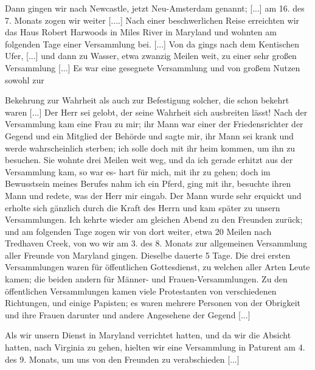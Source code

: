 Dann gingen wir nach Newcastle, jetzt Neu-Amsterdam
genannt; [...] am 16. des 7. Monats zogen wir weiter [....]
Nach einer beschwerlichen Reise erreichten wir das Haus Robert
Harwoods in Miles River 
in Maryland und wohnten am
folgenden Tage einer Versammlung bei. [...] Von da gings
nach dem Kentischen Ufer, [...] und dann zu Wasser, etwa zwanzig
Meilen weit, zu einer sehr großen Versammlung [...] Es war
eine gesegnete Versammlung und von großem Nutzen sowohl zur

Bekehrung zur Wahrheit als auch zur Befestigung solcher, die
schon bekehrt waren [...] Der Herr sei gelobt, der seine 
Wahrheit sich ausbreiten lässt! Nach der Versammlung kam eine Frau
zu mir; ihr Mann war einer der Friedensrichter der Gegend
und ein Mitglied der Behörde und sagte mir, ihr Mann
sei krank und werde wahrscheinlich sterben; ich solle doch mit ihr
heim kommen, um ihn zu besuchen. Sie wohnte drei Meilen weit
weg, und da ich gerade erhitzt aus der Versammlung kam, so war
es- hart für mich, mit ihr zu gehen; doch im Bewusstsein meines
Berufes nahm ich ein Pferd, ging mit ihr, besuchte ihren Mann
und redete, was der Herr mir eingab. Der Mann wurde sehr
erquickt und erholte sich gänzlich durch die Kraft des Herrn und
kam später zu unsern Versammlungen. Ich kehrte wieder am
gleichen Abend zu den Freunden zurück; und am folgenden Tage
zogen wir von dort weiter, etwa 20 Meilen nach Tredhaven
Creek, von wo wir am 3. des 8. Monats 
zur allgemeinen Versammlung aller Freunde von Maryland gingen. Dieselbe dauerte
5 Tage. Die drei ersten Versammlungen waren für öffentlichen
Gottesdienst, zu welchen 
aller Arten Leute kamen; die beiden
andern für Männer- und Frauen-Versammlungen. Zu den öffentlichen 
Versammlungen kamen viele Protestanten von verschiedenen
Richtungen, und einige Papisten; es waren mehrere Personen
von der Obrigkeit und ihre Frauen darunter und andere Angesehene 
der Gegend [...] 

Als wir unsern Dienst in Maryland verrichtet hatten, und
da wir die Absicht hatten, nach Virginia zu gehen, hielten wir
eine Versammlung in Paturent am 4. des 9. Monats, um uns
von den Freunden zu verabschieden [...]

